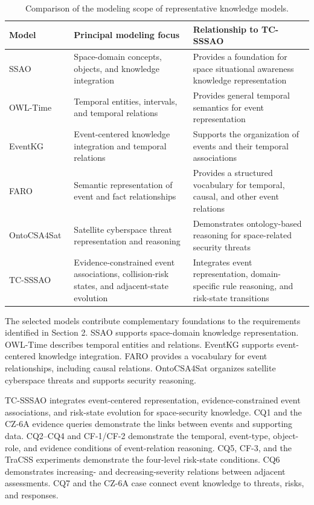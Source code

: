 \documentclass[Royal,sageh,times]{sagej}
\begin{document}
\begin{table}[!t]
  \centering
  \caption{Comparison of the modeling scope of representative knowledge models.}
  \label{tab:semantic-capability-comparison}
  \footnotesize
  \begin{tabularx}{\textwidth}{l>{\raggedright\arraybackslash}Y>{\raggedright\arraybackslash}Y}
    \toprule
    \textbf{Model} & \textbf{Principal modeling focus} & \textbf{Relationship to TC-SSSAO} \\
    \midrule
    SSAO~\citep{rovetto2016ssao} & Space-domain concepts, objects, and knowledge integration & Provides a foundation for space situational awareness knowledge representation \\
    OWL-Time~\citep{cox2017owltime} & Temporal entities, intervals, and temporal relations & Provides general temporal semantics for event representation \\
    EventKG~\citep{gottschalk2018eventkg} & Event-centered knowledge integration and temporal relations & Supports the organization of events and their temporal associations \\
    FARO~\citep{rebboud2022faro} & Semantic representation of event and fact relationships & Provides a structured vocabulary for temporal, causal, and other event relations \\
    OntoCSA4Sat~\citep{liu2023ontocsa} & Satellite cyberspace threat representation and reasoning & Demonstrates ontology-based reasoning for space-related security threats \\
    TC-SSSAO & Evidence-constrained event associations, collision-risk states, and adjacent-state evolution & Integrates event representation, domain-specific rule reasoning, and risk-state transitions \\
    \bottomrule
  \end{tabularx}
\end{table}

The selected models contribute complementary foundations to the requirements identified in Section 2. SSAO supports space-domain knowledge representation. OWL-Time describes temporal entities and relations. EventKG supports event-centered knowledge integration. FARO provides a vocabulary for event relationships, including causal relations. OntoCSA4Sat organizes satellite cyberspace threats and supports security reasoning.

TC-SSSAO integrates event-centered representation, evidence-constrained event associations, and risk-state evolution for space-security knowledge. CQ1 and the CZ-6A evidence queries demonstrate the links between events and supporting data. CQ2--CQ4 and CF-1/CF-2 demonstrate the temporal, event-type, object-role, and evidence conditions of event-relation reasoning. CQ5, CF-3, and the TraCSS experiments demonstrate the four-level risk-state conditions. CQ6 demonstrates increasing- and decreasing-severity relations between adjacent assessments. CQ7 and the CZ-6A case connect event knowledge to threats, risks, and responses.
\end{document}
